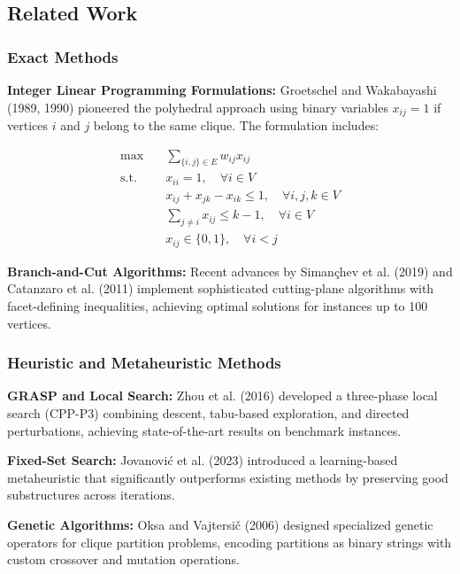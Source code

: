 \documentclass[12pt,a4paper]{article}
\begin{document}
\subsection{Related Work}

\subsubsection{Exact Methods}

\textbf{Integer Linear Programming Formulations:} Groetschel and Wakabayashi (1989, 1990) pioneered the polyhedral approach using binary variables $x_{ij} = 1$ if vertices $i$ and $j$ belong to the same clique. The formulation includes:

\begin{align}
\max \quad & \sum_{\{i,j\} \in E} w_{ij} x_{ij} \\
\text{s.t.} \quad & x_{ii} = 1, \quad \forall i \in V \\
& x_{ij} + x_{jk} - x_{ik} \leq 1, \quad \forall i,j,k \in V \\
& \sum_{j \neq i} x_{ij} \leq k-1, \quad \forall i \in V \\
& x_{ij} \in \{0,1\}, \quad \forall i < j
\end{align}

\textbf{Branch-and-Cut Algorithms:} Recent advances by Simançhev et al. (2019) and Catanzaro et al. (2011) implement sophisticated cutting-plane algorithms with facet-defining inequalities, achieving optimal solutions for instances up to 100 vertices.

\subsubsection{Heuristic and Metaheuristic Methods}

\textbf{GRASP and Local Search:} Zhou et al. (2016) developed a three-phase local search (CPP-P3) combining descent, tabu-based exploration, and directed perturbations, achieving state-of-the-art results on benchmark instances.

\textbf{Fixed-Set Search:} Jovanović et al. (2023) introduced a learning-based metaheuristic that significantly outperforms existing methods by preserving good substructures across iterations.

\textbf{Genetic Algorithms:} Oksa and Vajtersič (2006) designed specialized genetic operators for clique partition problems, encoding partitions as binary strings with custom crossover and mutation operations.
\end{document}
